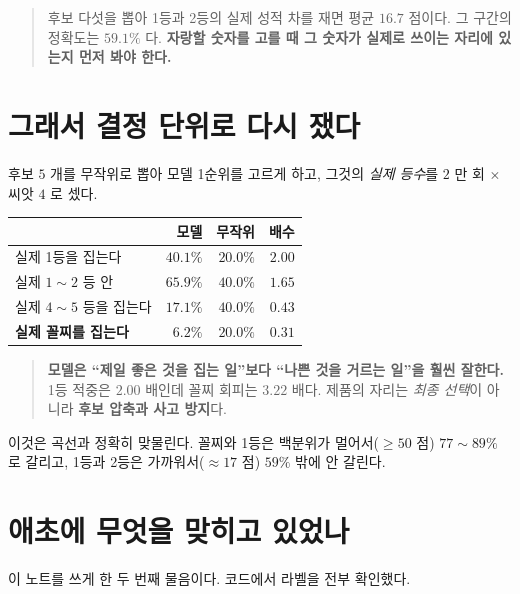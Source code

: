 \documentclass[11pt]{article}
\begin{document}
\begin{quote}
후보 다섯을 뽑아 1등과 2등의 실제 성적 차를 재면 평균 $\mathbf{16.7}$ 점이다.
그 구간의 정확도는 $\mathbf{59.1\%}$ 다. \textbf{자랑할 숫자를 고를 때 그
숫자가 실제로 쓰이는 자리에 있는지 먼저 봐야 한다.}
\end{quote}

\section{그래서 결정 단위로 다시 쟀다}

후보 $5$ 개를 무작위로 뽑아 모델 1순위를 고르게 하고, 그것의 \emph{실제 등수}를
$2$ 만 회 $\times$ 씨앗 $4$ 로 셌다.

\begin{center}
\begin{tabular}{lrrr}
\hline
 & 모델 & 무작위 & 배수 \\
\hline
실제 1등을 집는다 & $40.1\%$ & $20.0\%$ & $2.00$ \\
실제 $1\!\sim\!2$ 등 안 & $65.9\%$ & $40.0\%$ & $1.65$ \\
실제 $4\!\sim\!5$ 등을 집는다 & $17.1\%$ & $40.0\%$ & $0.43$ \\
\textbf{실제 꼴찌를 집는다} & $\mathbf{6.2\%}$ & $20.0\%$ & $\mathbf{0.31}$ \\
\hline
\end{tabular}
\end{center}

\begin{quote}
\textbf{모델은 ``제일 좋은 것을 집는 일''보다 ``나쁜 것을 거르는 일''을
훨씬 잘한다.} 1등 적중은 $2.00$ 배인데 꼴찌 회피는 $3.22$ 배다.
제품의 자리는 \emph{최종 선택}이 아니라 \textbf{후보 압축과 사고 방지}다.
\end{quote}

이것은 곡선과 정확히 맞물린다. 꼴찌와 1등은 백분위가 멀어서($\ge 50$ 점)
$77\!\sim\!89\%$ 로 갈리고, 1등과 2등은 가까워서($\approx 17$ 점)
$59\%$ 밖에 안 갈린다.

\section{애초에 무엇을 맞히고 있었나}

이 노트를 쓰게 한 두 번째 물음이다. 코드에서 라벨을 전부 확인했다.
\end{document}
